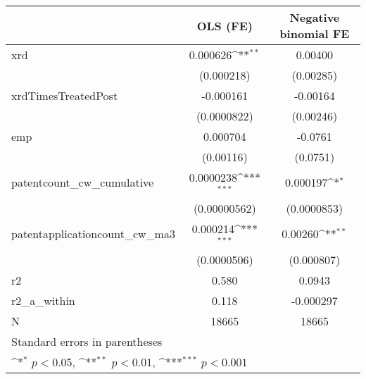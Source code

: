{
\def\sym#1{\ifmmode^{#1}\else\(^{#1}\)\fi}
\begin{tabular}{l*{2}{c}}
\hline\hline
            &\multicolumn{1}{c}{OLS (FE)}&\multicolumn{1}{c}{Negative binomial FE}\\
\hline
xrd         &    0.000626\sym{**} &     0.00400         \\
            &  (0.000218)         &   (0.00285)         \\
[1em]
xrdTimesTreatedPost&   -0.000161         &    -0.00164         \\
            & (0.0000822)         &   (0.00246)         \\
[1em]
emp         &    0.000704         &     -0.0761         \\
            &   (0.00116)         &    (0.0751)         \\
[1em]
patentcount\_cw\_cumulative&   0.0000238\sym{***}&    0.000197\sym{*}  \\
            &(0.00000562)         & (0.0000853)         \\
[1em]
patentapplicationcount\_cw\_ma3&    0.000214\sym{***}&     0.00260\sym{**} \\
            & (0.0000506)         &  (0.000807)         \\
\hline
r2          &       0.580         &      0.0943         \\
r2\_a\_within &       0.118         &   -0.000297         \\
N           &       18665         &       18665         \\
\hline\hline
\multicolumn{3}{l}{\footnotesize Standard errors in parentheses}\\
\multicolumn{3}{l}{\footnotesize \sym{*} \(p<0.05\), \sym{**} \(p<0.01\), \sym{***} \(p<0.001\)}\\
\end{tabular}
}

